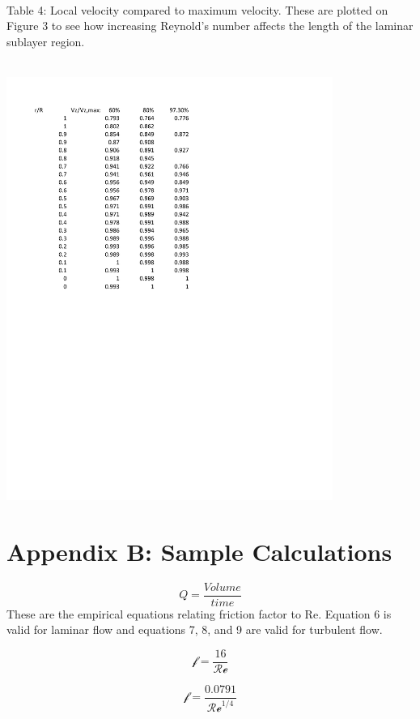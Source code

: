 \documentclass{article}
\begin{document}
\caption{\label{fig1}\\ Table 4: Local velocity compared to maximum velocity. These are plotted on Figure 3 to see how increasing Reynold's number affects the length of the laminar sublayer region.}
\linebreak \\ 
\centering\includegraphics[width=0.8\textwidth]{images/table_0.pdf}\raggedright


\centering \section*{Appendix B: Sample Calculations} \raggedright

\begin{equation} 
Q=\frac{Volume}{time}
\end{equation}
These are the empirical equations relating friction factor to Re. Equation 6 is valid for laminar flow and equations 7, 8, and 9 are valid for turbulent flow.

\begin{equation} 
\mathcal{f}=\frac{16}{\mathcal{Re}}
\end{equation}


\begin{equation} 
\mathcal{f} = \frac{0.0791}{\mathcal{Re}^{1/4}}
\end{equation}
\end{document}
